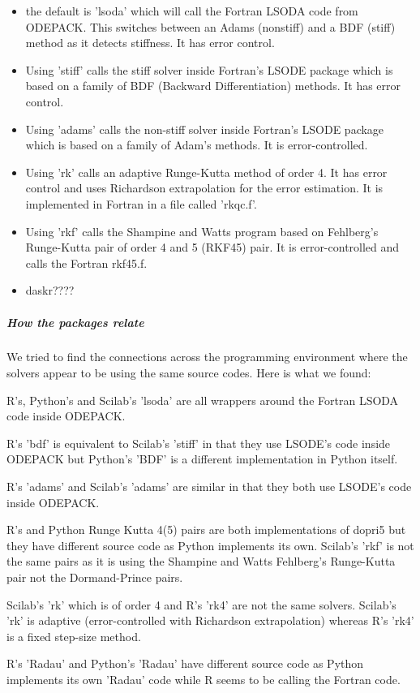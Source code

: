 \begin{itemize}
\item the default is 'lsoda' which will call the Fortran LSODA code from ODEPACK. This switches between an Adams (nonstiff) and a BDF (stiff) method as it detects stiffness. It has error control.
\item Using 'stiff' calls the stiff solver inside Fortran's LSODE package which is based on a family of BDF (Backward Differentiation) methods. It has error control.
\item Using 'adams' calls the non-stiff solver inside Fortran's LSODE package which is based on a family of Adam's methods. It is error-controlled.
\item Using 'rk' calls an adaptive Runge-Kutta method of order 4. It has error control and uses Richardson extrapolation for the error estimation. It is implemented in Fortran in a file called 'rkqc.f'.
\item Using 'rkf' calls the Shampine and Watts program based on Fehlberg's Runge-Kutta pair of order 4 and 5 (RKF45) pair. It is error-controlled and calls the Fortran rkf45.f.
\item daskr????
\end{itemize}

\subparagraph{How the packages relate}
We tried to find the connections across the programming environment where the solvers appear to be using the same source codes.
Here is what we found:

R's, Python's and Scilab's 'lsoda' are all wrappers around the Fortran LSODA code inside ODEPACK.

R's 'bdf' is equivalent to Scilab's 'stiff' in that they use LSODE's code inside ODEPACK but Python's 'BDF' is a different implementation in Python itself.

R's 'adams' and Scilab's 'adams' are similar in that they both use LSODE's code inside ODEPACK.

R's and Python Runge Kutta 4(5) pairs are both implementations of dopri5 but they have different source code as Python implements its own. Scilab's 'rkf' is not the same pairs as it is using the Shampine and Watts Fehlberg's Runge-Kutta pair not the Dormand-Prince pairs.

Scilab's 'rk' which is of order 4 and R's 'rk4' are not the same solvers. Scilab's 'rk' is adaptive (error-controlled with Richardson extrapolation) whereas R's 'rk4' is a fixed step-size method.

R's 'Radau' and Python's 'Radau' have different source code as Python implements its own 'Radau' code while R seems to be calling the Fortran code.

